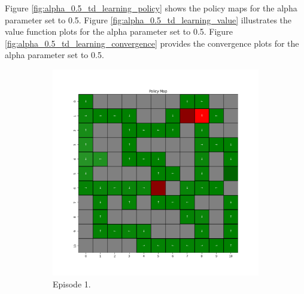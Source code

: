\documentclass{assignment}
\begin{document}
Figure \ref{fig:alpha_0.5_td_learning_policy} shows the policy maps for the alpha parameter set to 0.5. Figure \ref{fig:alpha_0.5_td_learning_value} illustrates the value function plots for the alpha parameter set to 0.5. Figure \ref{fig:alpha_0.5_td_learning_convergence} provides the convergence plots for the alpha parameter set to 0.5.

\begin{figure}[H]
    \begin{subfigure}{0.3\textwidth}
        \includegraphics[width=\textwidth]{figures/policy_td/alpha_sweep/policy_alpha_0.5_gamma_0.95_epsilon_0.2_iteration_1.png}
    \caption{Episode 1.}
    \end{subfigure}\hfill
    \begin{subfigure}{0.3\textwidth}

\end{subfigure}
\end{figure}
\end{document}

